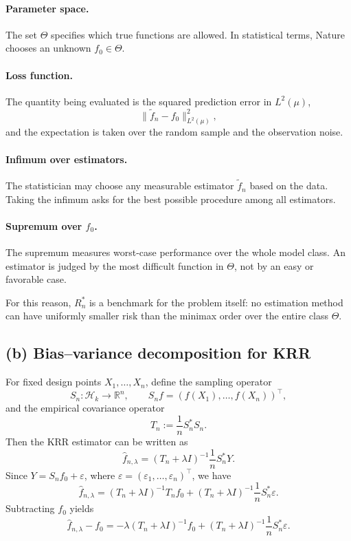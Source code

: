 \documentclass[11pt,en]{elegantpaper}
\newcommand{\R}{\mathbb{R}}
\newcommand{\Hs}{\mathcal{H}_k}
\begin{document}
\paragraph{Parameter space.}
The set \(\Theta\) specifies which true functions are allowed. In statistical terms,
Nature chooses an unknown \(f_0\in \Theta\).

\paragraph{Loss function.}
The quantity being evaluated is the squared prediction error in \(L^2(\mu)\),
\[
\|\tilde f_n-f_0\|_{L^2(\mu)}^2,
\]
and the expectation is taken over the random sample and the observation noise.

\paragraph{Infimum over estimators.}
The statistician may choose any measurable estimator \(\tilde f_n\) based on the data.
Taking the infimum asks for the best possible procedure among all estimators.

\paragraph{Supremum over \(f_0\).}
The supremum measures worst-case performance over the whole model class. An estimator is
judged by the most difficult function in \(\Theta\), not by an easy or favorable case.

For this reason, \(R_n^\ast\) is a benchmark for the problem itself: no estimation method
can have uniformly smaller risk than the minimax order over the entire class \(\Theta\).

\subsection*{(b) Bias--variance decomposition for KRR}

For fixed design points \(X_1,\dots,X_n\), define the sampling operator
\[
S_n:\Hs\to\R^n, \qquad
S_n f=(f(X_1),\dots,f(X_n))^\top,
\]
and the empirical covariance operator
\[
T_n:=\frac{1}{n}S_n^\ast S_n.
\]
Then the KRR estimator can be written as
\[
\hat f_{n,\lambda}=(T_n+\lambda I)^{-1}\frac{1}{n}S_n^\ast Y.
\]
Since \(Y=S_n f_0+\varepsilon\), where
\(\varepsilon=(\varepsilon_1,\dots,\varepsilon_n)^\top\), we have
\[
\hat f_{n,\lambda}
=(T_n+\lambda I)^{-1}T_n f_0
+(T_n+\lambda I)^{-1}\frac{1}{n}S_n^\ast \varepsilon.
\]
Subtracting \(f_0\) yields
\[
\hat f_{n,\lambda}-f_0
=-\lambda (T_n+\lambda I)^{-1}f_0
+(T_n+\lambda I)^{-1}\frac{1}{n}S_n^\ast \varepsilon.
\]
\end{document}
